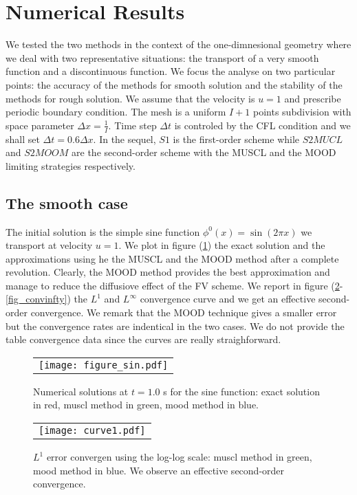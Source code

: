 \section{Numerical Results}
\label{sec:500}
We tested the two methods in the context of the one-dimnesional geometry where we deal with two representative situations:
the transport of a very smooth function  and a discontinuous function. We focus the analyse on two particular points:
the accuracy of the methods for smooth solution and the stability of the methods for rough solution.
We assume that the velocity is $u=1$ and prescribe periodic boundary condition. The mesh is a uniform $I+1$ points
subdivision with space parameter $\Delta x=\frac{1}{I}$. Time step $\Delta t$ is controled by the CFL condition and we 
shall set $\Delta t=0.6 \Delta x$.
In the sequel, $S1$ is the first-order scheme while $S2MUCL$ and $S2MOOM$ are the second-order scheme with the MUSCL and 
the MOOD limiting strategies respectively.
\subsection{The smooth case}
The initial solution is the simple sine function $\phi^0(x)=\sin(2\pi x)$ we transport at velocity $u=1$.
We plot in figure (\ref{fig_sine}) the exact solution and the approximations using he the MUSCL and the MOOD method
after a complete revolution. Clearly, the MOOD method provides the best approximation and manage to reduce
the diffusiove effect of the FV scheme. We report in figure (\ref{fig_conv1}-\ref{fig_convinfty}) the $L^1$ and $L^\infty$
convergence curve and we get an effective second-order convergence. We remark that the MOOD technique gives a smaller
error but the convergence rates are indentical in the two cases.
We do not provide the table convergence data since the curves are really straighforward. 
\begin{figure}[ht]
\begin{center}
\begin{tabular}{c}
\texttt{[image: figure\_sin.pdf]}
\end{tabular}
\end{center}
\caption{\label{fig_sine} \footnotesize Numerical solutions at $t=1.0$ s for the sine function: 
exact solution in red, muscl method in green, mood method in blue.}
\end{figure}


\begin{figure}[t]
\begin{center}
\begin{tabular}{c}
\texttt{[image: curve1.pdf]}
\end{tabular}
\end{center}
\caption{\label{fig_conv1}  \footnotesize $L^1$ error convergen using the log-log scale: muscl method in green, mood method in blue.
We observe an effective second-order convergence.}
\end{figure}


